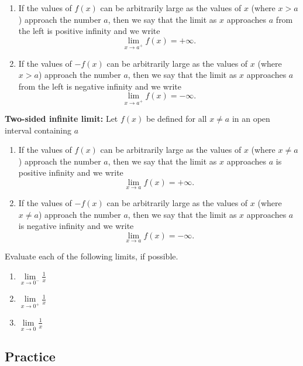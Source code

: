 \begin{enumerate}[sepno]
\item
  If the values of \(f(x)\) can be arbitrarily large as the values of
  \(x\) (where \(x>a\)) approach the number \(a\), then we say that the
  limit as \(x\) approaches \(a\) from the left is positive infinity and
  we write \[\lim\limits_{x \to a^+}f(x)=+\infty.\]
\item
  If the values of \(-f(x)\) can be arbitrarily large as the values of
  \(x\) (where \(x>a\)) approach the number \(a\), then we say that the
  limit as \(x\) approaches \(a\) from the left is negative infinity and
  we write \[\lim\limits_{x \to a^+}f(x)=-\infty.\]
\end{enumerate}

\textbf{Two-sided infinite limit:} Let \(f(x)\) be defined for all
\(x\neq a\) in an open interval containing \(a\)

\begin{enumerate}[parsep=0pt,after=\vspace{0pt}]
\item
  If the values of \(f(x)\) can be arbitrarily large as the values of
  \(x\) (where \(x\neq a\)) approach the number \(a\), then we say that the
  limit as \(x\) approaches \(a\) is positive infinity and we write
  \[\lim\limits_{x \to a} f(x)=+\infty.\]
\item
  If the values of \(-f(x)\) can be arbitrarily large as the values of
  \(x\) (where \(x\neq a\)) approach the number \(a\), then we say that the
  limit as \(x\) approaches \(a\) is negative infinity and we write
  \[\lim\limits_{x \to a}f(x)=-\infty.\]
\end{enumerate}

\begin{example}
  Evaluate each of the following limits, if possible.
  
  \begin{enumerate}
  \item
    \(\lim\limits_{x \to 0^-} \frac{1}{x}\)
  \item
    \(\lim\limits_{x \to 0^+} \frac{1}{x}\)
  \item
    \(\lim\limits_{x \to 0}\frac{1}{x}\)
  \end{enumerate}
\end{example}

\subsection{Practice}


